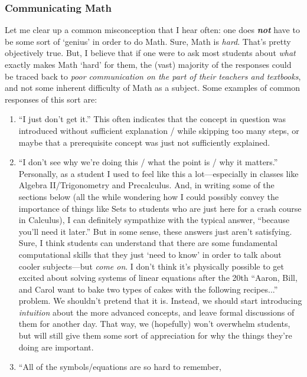 \documentclass[10pt]{article}
\theoremstyle{definition}
\begin{document}
{\subsubsection{Communicating Math}
Let me clear up a common misconception that I hear often: one does
\emph{\textbf{not}} have to be some sort of `genius' in order to do
Math.  Sure, Math is \emph{hard}.  That's pretty objectively true.
But, I believe that if one were to ask most students about \emph{what}
exactly makes Math `hard' for them, the (vast) majority of the
responses could be traced back to \emph{poor communication on the part
  of their teachers and textbooks}, and not some inherent difficulty
of Math as a subject.  Some examples of common responses of this sort
are:
\begin{enumerate}
    \item ``I just don't get it.''  This often indicates that the
      concept in question was introduced without sufficient
      explanation / while skipping too many steps, or maybe that a
      prerequisite concept was just not sufficiently explained.
    \item ``I don't see why we're doing this / what the point is / why
      it matters.''  Personally, as a student I used to feel like this
      a lot---especially in classes like Algebra II/Trigonometry and
      Precalculus.  And, in writing some of the sections below (all
      the while wondering how I could possibly convey the importance
      of things like Sets to students who are just here for a crash
      course in Calculus), I can definitely sympathize with the
      typical answer, ``because you'll need it later.''  But in some
      sense, these answers just aren't satisfying.  Sure, I think
      students can understand that there are some fundamental
      computational skills that they just `need to know' in order to
      talk about cooler subjects---but \emph{come on}.  I don't think
      it's physically possible to get excited about solving systems of
      linear equations after the 20th ``Aaron, Bill, and Carol want to
      bake two types of cakes with the following recipes...'' problem.
      We shouldn't pretend that it is.  Instead, we should start
      introducing \emph{intuition} about the more advanced concepts,
      and leave formal discussions of them for another day.  That way,
      we (hopefully) won't overwhelm students, but will still give
      them some sort of appreciation for why the things they're doing
      are important.
    \item ``All of the symbols/equations are so hard to remember,

\end{enumerate}}
\end{document}
